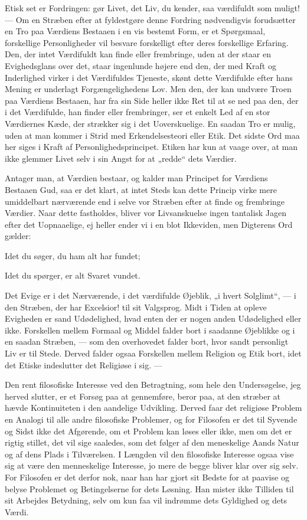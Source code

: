 \documentclass[12pt,a4paper,openany]{book}
\newcommand{\opage}[1]{\marginnote{\footnotesize\textit{[#1]}}}
\begin{document}
Etisk set er Fordringen: gør Livet, det Liv, du kender, saa værdifuldt
som muligt! --- Om en Stræben efter at fyldestgøre denne Fordring
nødvendigvis forudsætter en Tro paa Værdiens Bestaaen i en vis bestemt
Form, er et Spørgsmaal, forskellige Personligheder vil besvare
forskelligt efter deres forskellige Erfaring. Den, der intet Værdifuldt
kan finde eller frembringe, uden at der staar en Evighedsglans over det,
staar ingenlunde højere end den, der med Kraft og Inderlighed virker i
det Værdifuldes Tjeneste, skønt dette Værdifulde efter hans Mening er
underlagt Forgængelighedens Lov. Men den, der kan undvære Troen paa
Værdiens Bestaaen, har fra sin Side heller ikke Ret til at se ned paa
den, der i det Værdifulde, han finder eller frembringer, ser et enkelt
Led af en stor Værdiernes Kæde, der strækker sig i det Uoverskuelige. En
saadan Tro er mulig, uden at man kommer i Strid med Erkendelsesteori
eller Etik. Det sidste Ord maa her siges i Kraft af
Personlighedsprincipet. Etiken har kun at vaage over, at man ikke
glemmer Livet selv i sin Angst for at „redde“ dets Værdier.

Antager man, at Værdien bestaar, og kalder man Principet for Værdiens
Bestaaen Gud, saa er det klart, at intet Steds kan dette Princip virke
mere umiddelbart nærværende end i selve vor Stræben efter at finde og
frembringe Værdier. Naar dette fastholdes, bliver vor Livsanskuelse
ingen tantalisk Jagen efter det Uopnaaelige, ej heller ender vi i en
blot Ikkeviden, men Digterens Ord gælder:

Idet du søger, du ham alt har fundet;

Idet du spørger, er alt Svaret vundet.

Det Evige er i det Nærværende, i det værdifulde Øjeblik, „i hvert
Solglimt“, --- i den Stræben, der har Excelsior! til sit
\opage{244}Valgsprog. Midt i Tiden at opleve Evigheden er sand
Udødelighed, hvad enten der er nogen anden Udødelighed eller ikke.
Forskellen mellem Formaal og Middel falder bort i saadanne Øjeblikke og
i en saadan Stræben, --- som den overhovedet falder bort, hvor sandt
personligt Liv er til Stede. Derved falder ogsaa Forskellen mellem
Religion og Etik bort, idet det Etiske indeslutter det Religiøse i sig.
---

Den rent filosofiske Interesse ved den Betragtning, som hele den
Undersøgelse, jeg herved slutter, er et Forsøg paa at gennemføre, beror
paa, at den stræber at hævde Kontinuiteten i den aandelige Udvikling.
Derved faar det religiøse Problem en Analogi til alle andre filosofiske
Problemer, og for Filosofen er det til Syvende og Sidst ikke det
Afgørende, om et Problem kan løses eller ikke, men om det er rigtig
stillet, det vil sige saaledes, som det følger af den meneskelige Aands
Natur og af dens Plads i Tilværelsen. I Længden vil den filosofiske
Interesse ogsaa vise sig at være den menneskelige Interesse, jo mere de
begge bliver klar over sig selv. For Filosofen er det derfor nok, naar
han har gjort sit Bedste for at paavise og belyse Problemet og
Betingelserne for dets Løsning. Han mister ikke Tilliden til sit
Arbejdes Betydning, selv om kun faa vil indrømme dets Gyldighed og dets
Værdi.
\end{document}
